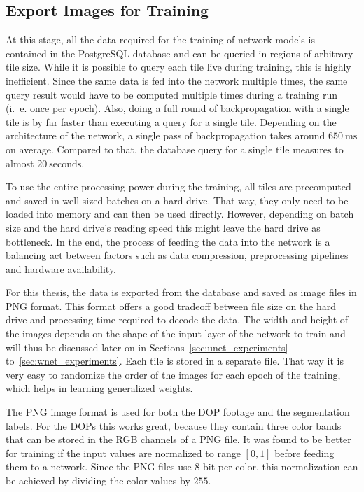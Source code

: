 \subsection{Export Images for Training}
\label{sec:image_export}
At this stage, all the data required for the training of network models is contained in the PostgreSQL database and can be queried in regions of arbitrary tile size. While it is possible to query each tile live during training, this is highly inefficient. Since the same data is fed into the network multiple times, the same query result would have to be computed multiple times during a training run (i.~e. once per epoch). Also, doing a full round of backpropagation with a single tile is by far faster than executing a query for a single tile. Depending on the architecture of the network, a single pass of backpropagation takes around $650~\text{ms}$ on average. Compared to that, the database query for a single tile measures to almost $20~\text{seconds}$.

To use the entire processing power during the training, all tiles are precomputed and saved in well-sized batches on a hard drive. That way, they only need to be loaded into memory and can then be used directly. However, depending on batch size and the hard drive's reading speed this might leave the hard drive as bottleneck. In the end, the process of feeding the data into the network is a balancing act between factors such as data compression, preprocessing pipelines and hardware availability.

For this thesis, the data is exported from the database and saved as image files in PNG format. This format offers a good tradeoff between file size on the hard drive and processing time required to decode the data. The width and height of the images depends on the shape of the input layer of the network to train and will thus be discussed later on in Sections~\ref{sec:unet_experiments} to~\ref{sec:wnet_experiments}. Each tile is stored in a separate file. That way it is very easy to randomize the order of the images for each epoch of the training, which helps in learning generalized weights.

The PNG image format is used for both the DOP footage and the segmentation labels. For the DOPs this works great, because they contain three color bands that can be stored in the RGB channels of a PNG file. It was found to be better for training if the input values are normalized to range $[0, 1]$ before feeding them to a network. Since the PNG files use 8 bit per color, this normalization can be achieved by dividing the color values by $255$.

